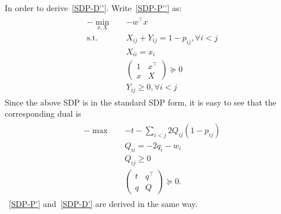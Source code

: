 \documentclass{article}
\begin{document}
In order to derive~\ref{SDP-D''}.
Write~\ref{SDP-P''} as:
\begin{align}
  \begin{split}
    -\min_{x,X}\quad &-w^\top x\\
    \text{s.t.}\quad &X_{ij}+Y_{ij}= 1-p_{ij},\forall i<j\\
    &X_{ii}=x_i\\
    &
    \begin{pmatrix}
      1&x^\top\\
      x&X
    \end{pmatrix}\succeq 0\\
    &Y_{ij}\geq 0, \forall i<j
  \end{split}
\end{align}
Since the above SDP is in the standard SDP form, it is easy to see that the corresponding dual is 
\begin{align}
  \begin{split}
    -\max\quad &-t-\sum_{i<j}2Q_{ij}(1-p_{ij})\\
    &Q_{ii}=-2q_i-w_i\\
    &Q_{ij}\geq 0\\
    &\begin{pmatrix}
      t&q^\top\\
      q&Q
    \end{pmatrix}\succeq 0.
  \end{split}
\end{align}
~\ref{SDP-P'} and~\ref{SDP-D'} are derived in the same way.
\end{document}
